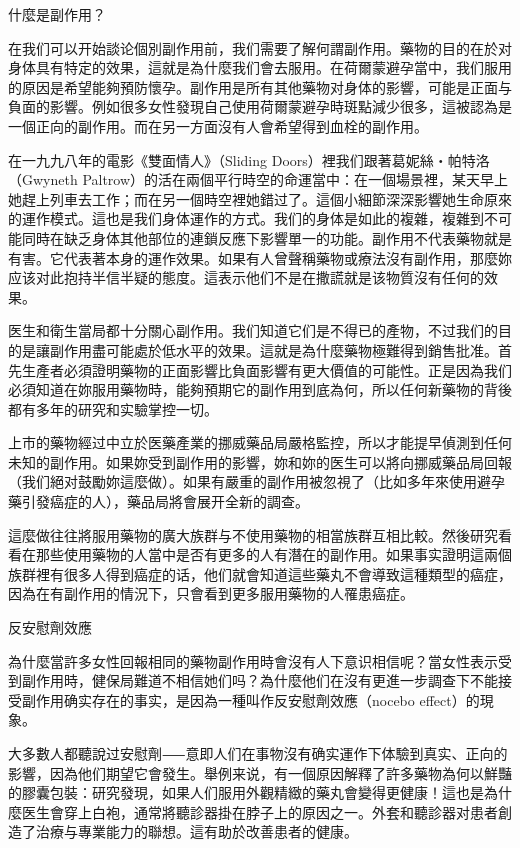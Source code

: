 \documentclass[12pt,UTF8]{ctexbook}
\begin{document}
什麼是副作用？




在我们可以开始談论個別副作用前，我们需要了解何謂副作用。藥物的目的在於对身体具有特定的效果，這就是為什麼我们會去服用。在荷爾蒙避孕當中，我们服用的原因是希望能夠預防懷孕。副作用是所有其他藥物对身体的影響，可能是正面与負面的影響。例如很多女性發現自己使用荷爾蒙避孕時斑點減少很多，這被認為是一個正向的副作用。而在另一方面沒有人會希望得到血栓的副作用。

在一九九八年的電影《雙面情人》（Sliding Doors）裡我们跟著葛妮絲‧帕特洛（Gwyneth Paltrow）的活在兩個平行時空的命運當中：在一個場景裡，某天早上她趕上列車去工作；而在另一個時空裡她錯过了。這個小細節深深影響她生命原來的運作模式。這也是我们身体運作的方式。我们的身体是如此的複雜，複雜到不可能同時在缺乏身体其他部位的連鎖反應下影響單一的功能。副作用不代表藥物就是有害。它代表著本身的運作效果。如果有人曾聲稱藥物或療法沒有副作用，那麼妳应该对此抱持半信半疑的態度。這表示他们不是在撒謊就是该物質沒有任何的效果。

医生和衛生當局都十分關心副作用。我们知道它们是不得已的產物，不过我们的目的是讓副作用盡可能處於低水平的效果。這就是為什麼藥物極難得到銷售批准。首先生產者必須證明藥物的正面影響比負面影響有更大價值的可能性。正是因為我们必須知道在妳服用藥物時，能夠預期它的副作用到底為何，所以任何新藥物的背後都有多年的研究和实驗掌控一切。

上市的藥物經过中立於医藥產業的挪威藥品局嚴格監控，所以才能提早偵測到任何未知的副作用。如果妳受到副作用的影響，妳和妳的医生可以將向挪威藥品局回報（我们絕对鼓勵妳這麼做）。如果有嚴重的副作用被忽視了（比如多年來使用避孕藥引發癌症的人），藥品局將會展开全新的調查。

這麼做往往將服用藥物的廣大族群与不使用藥物的相當族群互相比較。然後研究看看在那些使用藥物的人當中是否有更多的人有潛在的副作用。如果事实證明這兩個族群裡有很多人得到癌症的话，他们就會知道這些藥丸不會導致這種類型的癌症，因為在有副作用的情況下，只會看到更多服用藥物的人罹患癌症。





反安慰劑效應




為什麼當許多女性回報相同的藥物副作用時會沒有人下意识相信呢？當女性表示受到副作用時，健保局難道不相信她们吗？為什麼他们在沒有更進一步調查下不能接受副作用确实存在的事实，是因為一種叫作反安慰劑效應（nocebo effect）的現象。

大多數人都聽說过安慰劑⸺意即人们在事物沒有确实運作下体驗到真实、正向的影響，因為他们期望它會發生。舉例来说，有一個原因解釋了許多藥物為何以鮮豔的膠囊包裝：研究發現，如果人们服用外觀精緻的藥丸會變得更健康！這也是為什麼医生會穿上白袍，通常將聽診器掛在脖子上的原因之一。外套和聽診器对患者創造了治療与專業能力的聯想。這有助於改善患者的健康。
\end{document}
